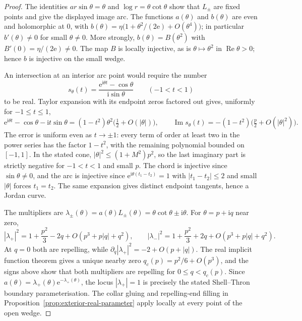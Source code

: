 \documentclass[11pt,a4paper]{article}
\theoremstyle{definition}
\newcommand{\eee}{\mathrm{e}}
\newcommand{\ii}{\mathrm{i}}
\begin{document}
\begin{proof}
The identities $a r\sin\theta=\theta$ and
$\log r=\theta\cot\theta$ show that $L_\pm$ are fixed points and
give the displayed image arc.  The functions $a(\theta)$ and
$b(\theta)$ are even and holomorphic at $0$, with
$b(\theta)=\eta\bigl(1+\theta^2/(2\eee)+O(\theta^4)\bigr)$;
in particular $b'(\theta)\ne0$ for small $\theta\ne0$.  More strongly,
$b(\theta)=B(\theta^2)$ with $B'(0)=\eta/(2\eee)\ne0$.
The map $B$ is locally injective, as is $\theta\mapsto\theta^2$ in
$\operatorname{Re}\theta>0$; hence $b$ is injective on the small wedge.

An intersection at an interior arc point would require the number
\[
 s_\theta(t)=
 \frac{\eee^{\ii\theta t}-\cos\theta}{\ii\sin\theta}
 \qquad(-1<t<1)
\]
to be real.  Taylor expansion with its endpoint zeros factored out
gives, uniformly for $-1\le t\le1$,
\[
 \eee^{\ii\theta t}-\cos\theta-\ii t\sin\theta
  =(1-t^2)\theta^2\bigl(\tfrac12+O(|\theta|)\bigr),
 \qquad
 \operatorname{Im}s_\theta(t)
  =-(1-t^2)\bigl(\tfrac p2+O(|\theta|^2)\bigr).
\]
The error is uniform even as $t\to\pm1$: every term of order at
least two in the power series has the factor $1-t^2$, with the
remaining polynomial bounded on $[-1,1]$.  In the stated cone,
$|\theta|^2\le(1+M^2)p^2$, so the last imaginary part is strictly
negative for $-1<t<1$ and small $p$.  The chord is injective since
$\sin\theta\ne0$, and the arc is injective since
$\eee^{\ii\theta(t_1-t_2)}=1$ with $|t_1-t_2|\le2$ and small
$|\theta|$ forces $t_1=t_2$.  The same expansion gives distinct
endpoint tangents, hence a Jordan curve.

The multipliers are
$\lambda_\pm(\theta)=a(\theta)L_\pm(\theta)
 =\theta\cot\theta\pm\ii\theta$.  For $\theta=p+\ii q$ near zero,
\[
 |\lambda_+|^2=1+\frac{p^2}{3}-2q
       +O(p^3+p|q|+q^2),\qquad
 |\lambda_-|^2=1+\frac{p^2}{3}+2q
       +O(p^3+p|q|+q^2).
\]
At $q=0$ both are repelling, while
$\partial_q|\lambda_+|^2=-2+O(p+|q|)$.  The real implicit function
theorem gives a unique nearby zero $q_c(p)=p^2/6+O(p^3)$, and the
signs above show that both multipliers are repelling for
$0\le q<q_c(p)$.  Since
$a(\theta)=\lambda_+(\theta)\eee^{-\lambda_+(\theta)}$,
the locus $|\lambda_+|=1$ is precisely the stated
Shell--Thron boundary parameterisation.  The collar gluing and
repelling-end filling in Proposition~\ref{prop:exterior-real-parameter}
apply locally at every point of the open wedge.
\end{proof}
\end{document}
